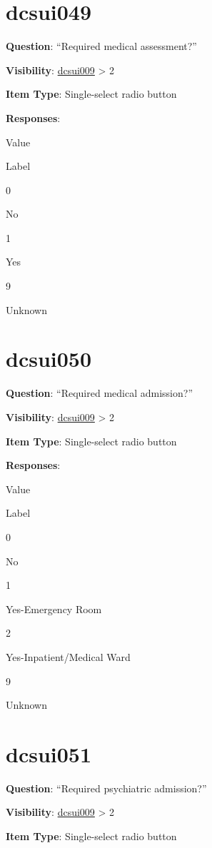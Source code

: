 \documentclass[]{book}
\begin{document}
\hypertarget{dcsui049}{%
\section{dcsui049}\label{dcsui049}}

\textbf{Question}: ``Required medical assessment?''

\textbf{Visibility}: \protect\hyperlink{dcsui009}{dcsui009} \textgreater{} 2

\textbf{Item Type}: Single-select radio button

\textbf{Responses}:

Value

Label

0

No

1

Yes

9

Unknown

\hypertarget{dcsui050}{%
\section{dcsui050}\label{dcsui050}}

\textbf{Question}: ``Required medical admission?''

\textbf{Visibility}: \protect\hyperlink{dcsui009}{dcsui009} \textgreater{} 2

\textbf{Item Type}: Single-select radio button

\textbf{Responses}:

Value

Label

0

No

1

Yes-Emergency Room

2

Yes-Inpatient/Medical Ward

9

Unknown

\hypertarget{dcsui051}{%
\section{dcsui051}\label{dcsui051}}

\textbf{Question}: ``Required psychiatric admission?''

\textbf{Visibility}: \protect\hyperlink{dcsui009}{dcsui009} \textgreater{} 2

\textbf{Item Type}: Single-select radio button
\end{document}

